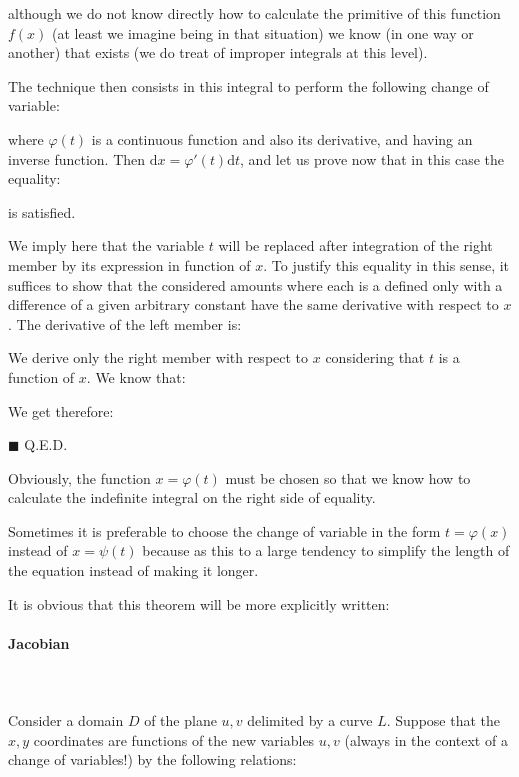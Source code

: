 	although we do not know directly how to calculate the primitive of this function $f(x)$ (at least we imagine being in that situation) we know (in one way or another) that exists (we do treat of improper integrals at this level).

	The technique then consists in this integral to perform the following change of variable:
	
	where $\varphi (t)$ is a continuous function and also its derivative, and having an inverse function. Then $\mathrm{d}x=\varphi' (t)\mathrm{d}t$, and let us prove now that in this case the equality:	
	
	is satisfied.
	\begin{dem}
	We imply here that the variable $t$ will be replaced after integration of the right member by its expression in function of $x$. To justify this equality in this sense, it suffices to show that the considered amounts where each is a defined only with a difference of a given arbitrary constant have the same derivative with respect to $x$. The derivative of the left member is:
	
	We derive only the right member with respect to $x$ considering that $t$ is a function of $x$. We know that:
	
	We get therefore:
	
	\begin{flushright}
		$\blacksquare$  Q.E.D.
	\end{flushright}
	\end{dem}
	Obviously, the function $x=\varphi (t)$ must be chosen so that we know how to calculate the indefinite integral on the right side of equality.
	\begin{tcolorbox}[title=Remark,colframe=black,arc=10pt]
	Sometimes it is preferable to choose the change of variable in the form $t=\varphi (x)$ instead of $x= \psi(t)$ because as this to a large tendency to simplify the length of the equation instead of making it longer.
	\end{tcolorbox}
	It is obvious that this theorem will be more explicitly written:
	
	
	\pagebreak
	\paragraph{Jacobian}\label{jacobian}\mbox{}\\\\
	Consider a domain $D$ of the plane  $u,v$ delimited by a curve $L$. Suppose that the $x, y$ coordinates are functions of the new variables $u, v$ (always in the context of a change of variables!) by the following relations:
	
